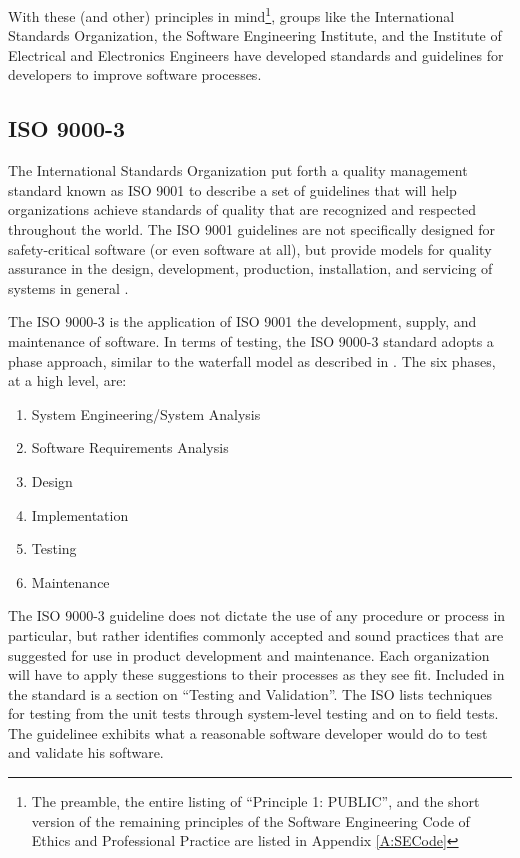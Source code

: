 With these (and other) principles in mind\footnote{The preamble, the entire
listing of ``Principle 1: PUBLIC'', and the short version of the remaining
principles of the Software Engineering Code of Ethics and Professional Practice
are listed in Appendix \ref{A:SECode}}, groups like the International Standards
Organization, the Software Engineering Institute, and the Institute of
Electrical and Electronics Engineers have developed standards and guidelines for
developers to improve software processes.

\subsection{ISO 9000-3}
The International Standards Organization put forth a quality management standard
known as ISO 9001 to describe a set of guidelines that will help organizations
achieve standards of quality that are recognized and respected throughout the
world. The ISO 9001 guidelines are not specifically designed for safety-critical
software (or even software at all), but provide models for quality assurance
in the design, development, production, installation, and servicing of systems
in general \cite{Kehoe96}.

The ISO 9000-3 is the application of ISO 9001 the development, supply, and
maintenance of software. In terms of testing, the ISO 9000-3 standard adopts a
phase approach, similar to the waterfall model as described in \cite{Royce70}.
The six phases, at a high level, are:
\singlespace
\begin{enumerate}
  \item System Engineering/System Analysis
  \item Software Requirements Analysis
  \item Design
  \item Implementation
  \item Testing
  \item Maintenance
\end{enumerate}
\doublespace

The ISO 9000-3 guideline does not dictate the use of any procedure or process in
particular, but rather identifies commonly accepted and sound practices that are
suggested for use in product development and maintenance. Each organization will
have to apply these suggestions to their processes as they see fit. Included in
the standard is a section on ``Testing and Validation''. The ISO lists
techniques for testing from the unit tests through system-level testing and on
to field tests. The guidelinee exhibits what a reasonable software developer
would do to test and validate his software.

